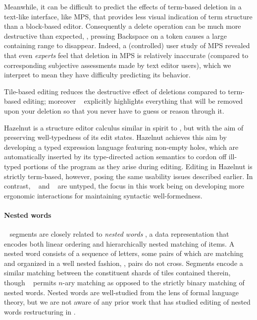 Meanwhile, it can be difficult to predict the
effects of term-based deletion in a text-like
interface, like MPS, that provides less visual
indication of term structure than a block-based editor.
Consequently a delete operation can be much
more destructive than expected, \eg,
pressing Backspace on a token
causes a large containing range to disappear.
Indeed, a (controlled) user study of MPS revealed
that even \emph{experts} feel that deletion in MPS
is relatively inaccurate (compared to corresponding
subjective assessments made by text editor users),
which we interpret to mean they have difficulty
predicting its behavior.


Tile-based editing reduces the destructive effect of deletions
compared to term-based editing; moreover \tylr~ explicitly
highlights everything that will be removed upon your deletion
so that you never have to guess or reason through it.





Hazelnut \cite{Hazelnut} is a structure editor calculus
similar in spirit to \ty, but with the aim of
preserving well-typedness of its edit states.
Hazelnut achieves this aim by developing a typed
expression language featuring non-empty holes, which
are automatically inserted by its type-directed action
semantics to cordon off ill-typed portions of the program
as they arise during editing.
Editing in Hazelnut is strictly term-based, however, posing
the same usability issues described earlier.
In contrast, \ty~ and \tylr~ are untyped, the focus in
this work being on developing more ergonomic interactions
for maintaining syntactic well-formedness.

\paragraph{Nested words}
\ty~ segments are closely related to \emph{nested words}
\cite{nested-words},
a data representation that encodes both linear
ordering and hierarchically nested matching
of items.
A nested word consists of a sequence of letters,
some pairs of which are matching and organized
in a well nested fashion, \ie, pairs do not cross.
Segments encode a similar matching between the
constituent shards of tiles contained therein,
though \ty~ permits $n$-ary matching as opposed
to the strictly binary matching of nested words.
Nested words are well-studied from the lens of
formal language theory, but we are not aware of
any prior work that has studied editing of nested words
\ala restructuring in \tylr.

